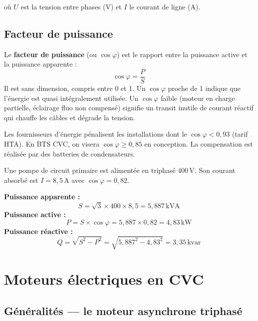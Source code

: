 où $U$ est la tension entre phases (V) et $I$ le courant de ligne (A).

\subsection{Facteur de puissance}

\begin{definition}
  Le \textbf{facteur de puissance} (ou $\cos\varphi$) est le rapport entre la puissance active et la puissance apparente :
  \begin{equation}
    \cos\varphi = \frac{P}{S}
  \end{equation}
  Il est sans dimension, compris entre 0 et 1. Un $\cos\varphi$ proche de 1 indique que l'énergie est quasi intégralement utilisée. Un $\cos\varphi$ faible (moteur en charge partielle, éclairage fluo non compensé) signifie un transit inutile de courant réactif qui chauffe les câbles et dégrade la tension.
\end{definition}

\begin{attention}
  Les fournisseurs d'énergie pénalisent les installations dont le $\cos\varphi < 0{,}93$ (tarif HTA). En BTS CVC, on visera $\cos\varphi \geq 0{,}85$ en conception. La compensation est réalisée par des batteries de condensateurs.
\end{attention}

\begin{exemple}[title={Calcul de puissance — pompe de chauffage triphasée}]
  Une pompe de circuit primaire est alimentée en triphasé 400\,V. Son courant absorbé est $I = 8{,}5\,\text{A}$ avec $\cos\varphi = 0{,}82$.

  \textbf{Puissance apparente :}
  \[
    S = \sqrt{3} \times 400 \times 8{,}5 = 5{,}887\,\text{kVA}
  \]
  \textbf{Puissance active :}
  \[
    P = S \times \cos\varphi = 5{,}887 \times 0{,}82 = 4{,}83\,\text{kW}
  \]
  \textbf{Puissance réactive :}
  \[
    Q = \sqrt{S^2 - P^2} = \sqrt{5{,}887^2 - 4{,}83^2} = 3{,}35\,\text{kvar}
  \]
\end{exemple}

\section{Moteurs électriques en CVC}

\subsection{Généralités — le moteur asynchrone triphasé}

